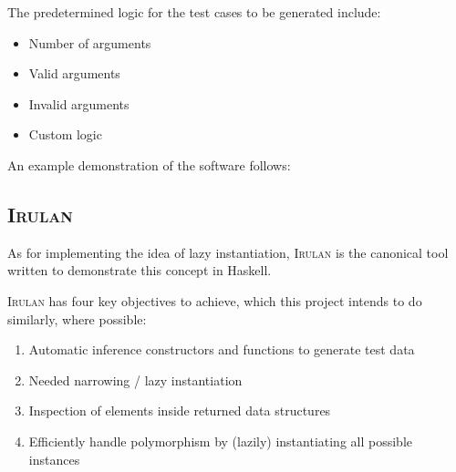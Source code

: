 \documentclass{icldt}
\numberwithin{equation}{section}       %
\begin{document}
The predetermined logic for the test cases to be generated include:
\begin{itemize}
	\item Number of arguments
	\item Valid arguments
	\item Invalid arguments
	\item Custom logic
\end{itemize}

An example demonstration of the software follows:







\subsection{\textsc{Irulan}}
As for implementing the idea of lazy instantiation, \textsc{Irulan} \cite{Allwood2011} is the canonical tool written to demonstrate this concept in Haskell.

\textsc{Irulan} has four key objectives to achieve, which this project intends to do similarly, where possible:
\begin{enumerate}[1.]
	\item Automatic inference constructors and functions to generate test data
	\item Needed narrowing / lazy instantiation
	\item Inspection of elements inside returned data structures
	\item Efficiently handle polymorphism by (lazily) instantiating all possible instances
\end{enumerate}
\end{document}
